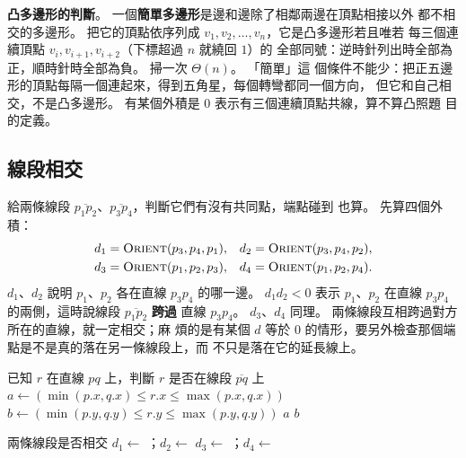 \textbf{凸多邊形的判斷}。 一個\textbf{簡單多邊形}是邊和邊除了相鄰兩邊在頂點相接以外
都不相交的多邊形。 把它的頂點依序列成 $v_1, v_2, \ldots, v_n$，它是凸多邊形若且唯若
每三個連續頂點 $v_i, v_{i+1}, v_{i+2}$（下標超過 $n$ 就繞回 $1$）的 
全部同號：逆時針列出時全部為正，順時針時全部為負。 掃一次 $\Theta(n)$。 「簡單」這
個條件不能少：把正五邊形的頂點每隔一個連起來，得到五角星，每個轉彎都同一個方向，
但它和自己相交，不是凸多邊形。 有某個外積是 $0$ 表示有三個連續頂點共線，算不算凸照題
目的定義。

\subsection{線段相交}
\label{sec:dc-segint}

給兩條線段 $\overline{p_1 p_2}$、$\overline{p_3 p_4}$，判斷它們有沒有共同點，端點碰到
也算。 先算四個外積：
\[
\begin{aligned}
d_1 &= \proc{Orient}(p_3, p_4, p_1), & d_2 &= \proc{Orient}(p_3, p_4, p_2), \\
d_3 &= \proc{Orient}(p_1, p_2, p_3), & d_4 &= \proc{Orient}(p_1, p_2, p_4).
\end{aligned}
\]
$d_1$、$d_2$ 說明 $p_1$、$p_2$ 各在直線 $p_3 p_4$ 的哪一邊。 $d_1 d_2 < 0$ 表示
$p_1$、$p_2$ 在直線 $p_3 p_4$ 的兩側，這時說線段 $\overline{p_1 p_2}$ \textbf{跨過}
直線 $p_3 p_4$。 $d_3$、$d_4$ 同理。 兩條線段互相跨過對方所在的直線，就一定相交；麻
煩的是有某個 $d$ 等於 $0$ 的情形，要另外檢查那個端點是不是真的落在另一條線段上，而
不只是落在它的延長線上。

\begin{pseudo}[label=alg:dc-onseg]{已知 $r$ 在直線 $pq$ 上，判斷 $r$ 是否在線段 $\overline{pq}$ 上}
    \State $a \gets (\min(p.x, q.x) \le r.x \le \max(p.x, q.x))$
    \State $b \gets (\min(p.y, q.y) \le r.y \le \max(p.y, q.y))$
    \State \Return $a$ \AND $b$
\EndFunction
\end{pseudo}

\begin{pseudo}[label=alg:dc-segint]{兩條線段是否相交}
    \State $d_1 \gets$ ；$d_2 \gets$ 
    \State $d_3 \gets$ ；$d_4 \gets$ 
        \State \Return \TRUE {}
    \EndIf
        \State \Return \TRUE
    \EndIf
        \State \Return \TRUE
    \EndIf
        \State \Return \TRUE
    \EndIf
        \State \Return \TRUE
    \EndIf
    \State \Return \FALSE
\EndFunction
\end{pseudo}

